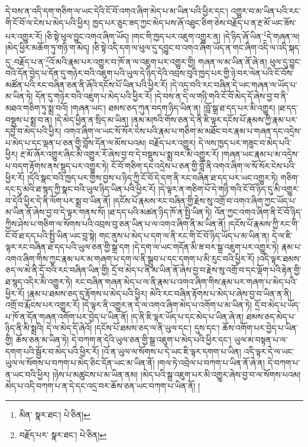 དེ་བས་ན་འདི་དག་གཅིག་ལ་ཡང་དེའི་ངོ་བོ་འགའ་ཞིག་མེད་པ་མ་ཡིན་པའི་ཕྱིར་དང་། འགྱུར་བ་མ་ཡིན་པའི་རང་གི་ངོ་བོ་ལ་ངེས་པ་མེད་པའི་ཕྱིར། ཁྱད་པར་ཅུང་ཟད་ཀྱང་མེད་པས་ཞོ་འཐུང་ཅིག་ཅེས་བརྗོད་པ་ན་རྔ་མོ་ཡང་ཟོས་པར་འགྱུར་རོ། །ཅི་སྟེ་ཕུལ་བྱུང་འགའ་ཞིག་ཡོད། །གང་གི་ཁྱད་པར་འཇུག་འགྱུར་ན། །དེ་ཉིད་ཞོ་ཡིན་\footnote{མིན་  སྣར་ཐང་།  པེ་ཅིན། }དེ་གཞན་ལ། །མེད་ཕྱིར་མཆོག་ཏུ་གཉི་ག་མེད། །ཅི་སྟེ་འདི་དག་ལ་ཕུལ་དུ་དབྱུང་བ་འགའ་ཞིག་ཡོད་ན་གང་ཞིག་འདི་ལ་འདི་སྐད་དུ་:བརྗོད་པ་ན་\footnote{བརྗོད་པར་  སྣར་ཐང་།  པེ་ཅིན། }འོ་མའི་རྣམ་པར་འགྱུར་བ་ཁོ་ན་ལ་འཇུག་པར་འགྱུར་གྱི། གཞན་ལ་མ་ཡིན་ནོ་ཞེ་ན། ཕུལ་དུ་བྱུང་བའི་དོན་བྱེད་པ་དོན་དུ་གཉེར་བའི་འཇུག་པའི་ཡུལ་དེ་ཉིད་དེའི་འབྲས་བུའི་ཁྱད་པར་གྱི་ཉེ་བར་ལེན་པའི་ངོ་བོས་མཚོན་པའི་རང་བཞིན་ཅན་ནི་ཞོའི་དངོས་པོ་ཡིན་པའི་ཕྱིར་རོ། །དེ་འདྲ་བའི་རང་བཞིན་དེ་ཡང་གཞན་ལ་ཡོད་པ་མ་ཡིན་ཏེ། དོན་དུ་གཉེར་བའི་འཇུག་པ་མེད་པའི་ཕྱིར་རོ། །དེ་བས་ན་དེ་ལ་གཉི་གའི་ངོ་བོ་མེད་དོ་ཞེས་བྱ་བ་ནི་མཐའ་གཅིག་ཏུ་སྨྲ་བའོ། །གཞན་ཡང་། ཐམས་ཅད་ཀུན་བདག་ཉིད་ཡིན་ན། །བློ་སྒྲ་ཐ་དད་པར་མི་འགྱུར། །ཐ་དད་བསྡུས་པ་སྨྲ་བ་ན། །དེ་མེད་ཕྱིན་ན་སྲིད་མ་ཡིན། །ནམ་མཁའི་གོས་ཅན་དེ་ནི་ཇི་ལྟར་དངོས་པོ་རྣམས་ཀྱི་རྣམ་པར་དབྱེ་བ་མེད་པའི་ཕྱིར། འགའ་ཞིག་ལ་ཡང་སོ་སོར་ངེས་པའི་རྣམ་པ་གཅིག་མ་མཐོང་བར་རྣམ་པ་གཞན་དང་འདྲེས་པ་མེད་པ་དང་ལྡན་པ་ཅན་གྱི་བློས་དོན་ལ་མོས་པའམ། བརྗོད་པར་འགྱུར། དེ་ལས་ཁྱད་པར་གཟུང་བ་མེད་པའི་ཕྱིར། རྔ་མོ་ཞོར་འགྱུར་ཞིང་མི་འགྱུར་རོ་ཞེས་བྱ་བ་དེ་བསྡུས་པ་སྨྲ་བར་མི་འགྱུར་རོ། །གཞན་ཡང་རྣམ་པ་མ་འདྲེས་པ་བདག་རྟོགས་ནས་སྡུད་པར་འགྱུར་ཏེ། ངོ་བོ་གཅིག་དང་འདྲེས་པ་ཅན་གྱི་བློ་ནི་འགའ་ཞིག་ལ་སོ་སོར་ངེས་པའི་ཕྱིར་རོ། །དེའི་སྣང་བའི་ཁྱད་པར་གྱིས་བྱས་པ་ཉིད་ཀྱི་ངོ་བོ་དེ་དག་ནི་རང་བཞིན་ཐ་དད་པར་ཡང་འགྱུར་ཏེ། གཅིག་དང་དུ་མའི་ཐ་སྙད་ཀྱི་སྣང་བའི་ཡུལ་ཉིད་ཡིན་པའི་ཕྱིར་རོ། །དེ་ལྟར་ན་གཅིག་པོ་དེ་གཉི་གའི་ངོ་བོ་ཉིད་དུ་མི་འགྱུར་བ་དེའི་ཕྱིར་དེ་ནི་ལོག་པར་སྨྲ་བ་ཡིན་ནོ། །དངོས་པོ་རྣམས་རང་བཞིན་གྱི་རྗེས་སུ་འགྲོ་བ་འགའ་ཞིག་ཀྱང་ཡོད་པ་མ་ཡིན་ནོ་ཞེས་བྱ་བ་དེ་ལྟར་གནས་སོ། །ཐ་དད་པའི་མཚན་ཉིད་ཁོ་ན་སྤྱི་ཡིན་ཏེ། འོན་ཀྱང་འགའ་ཞིག་ནི་ངོ་བོ་ཉིད་ཀྱིས་ཤེས་པ་གཅིག་ལ་སོགས་པའི་འབྲས་བུ་ཅན་ཡིན་པ་ལ་འགའ་ཞིག་ནི་མ་ཡིན་ནོ། །དངོས་པོ་རྣམས་ཀྱི་རང་གི་ངོ་བོ་ཐ་དད་པའི་སྤྱི་ཡིན་ཡང་བླ་སྟེ། གང་ནུས་པ་མེད་པ་དག་ལ་ནི་རང་གི་ངོ་བོ་ཉིད་ཡོད་པ་མ་ཡིན་ན། དེ་ལ་ཇི་ལྟར་རང་བཞིན་ཐ་དད་པའི་ཡུལ་ཅན་གྱི་སྒྲ་དག །དེ་དག་ལ་ཡང་གདོན་མི་ཟ་བར་སྒྲ་འཇུག་པར་འགྱུར་ཏེ། རྣམ་པ་འགའ་ཞིག་གིས་ཀྱང་རྣམ་པར་མ་གཞག་པ་དག་ལ་ནི་སྒྲུབ་པ་དང་དགག་པ་མི་རུང་བའི་ཕྱིར་རོ། །འདི་ལྟར་ཐམས་ཅད་ལ་མེ་ནི་དྲོ་བའི་རང་བཞིན་ཡིན་གྱི། དྲོ་བ་མེད་པ་ནི་མ་ཡིན་ནོ་ཞེས་བྱ་བ་རྗེས་སུ་འགྲོ་བ་དང་ལྡོག་པའི་རྟེན་གྱི་ཐ་སྙད་འདིར་མི་འགྱུར་ཏེ། རང་བཞིན་གཞན་མེད་པ་ལ་ནི་རྣམ་པ་འགའ་ཞིག་གིས་རྣམ་པར་གཞག་པ་མེད་པའི་ཕྱིར་རོ། །རྣམ་པ་ཐམས་ཅད་དུ་རྟོགས་པ་མེད་པའི་ཕྱིར། མེའི་རང་བཞིན་རྟོགས་པ་མེད་པ་ཞེས་བྱ་བ་ཡིན་ན་ནི། འགྲོ་བ་རྨོངས་པར་འགྱུར་རོ། །དེ་ལྟར་ནི་འགྱུར་ན་དེ་ལ་འགའ་ཞིག་མེད་པ་འགོག་པ་མ་ཡིན་ཏེ། དྲོ་བ་མེད་པ་ཡོད་པ་ཁོ་ན་དོན་གཞན་འགོག་པར་བྱེད་པ་ཡིན་ནོ། །ད་ནི་ཇི་ལྟར་ཡོད་པ་དང་མེད་པ་ཡིན་ཞེ་ན། ཐམས་ཅད་མེད་པ་ཉིད་ནི་མི་སྨྲའི། དེ་ལ་མེད་དོ་ཞེའོ། །དངོས་པོ་ཐམས་ཅད་ལ་ནི་ཡུལ་དང་། དུས་དང་། ཆོས་འགོག་པར་བྱེད་པ་ཡིན་གྱི། ཆོས་ཅན་མ་ཡིན་ཏེ། དེ་བཀག་ན་དེའི་ཡུལ་ཅན་གྱི་སྒྲ་འཇུག་པ་མེད་པའི་ཕྱིར་དང་། ཡུལ་མ་བསྟན་པ་ལ་དགག་པའི་སྦྱོར་བ་མེད་པའི་ཕྱིར་རོ། །འོ་ན་ཡུལ་ལ་སོགས་པ་དེ་ཡང་ཇི་ལྟར་དགག་པ་ཡིན། འདི་ལྟར་དེ་ལ་ཡང་ཡུལ་ལ་སོགས་པ་བཀག་པ་མེད་ཅིང་དོན་ཡང་མ་ཡིན་ནོ། །གལ་ཏེ་འབྲེལ་པ་བཀག་པ་ཡིན་ནོ་ཞེ་ན། དེ་བཀག་པ་ན་ཡང་བའི་ཕྱིར། །ཉེས་པ་མཚུངས་པ་མ་ཡིན་ནམ། །མེད་པའི་སྒྲ་འཇུག་པར་མི་འགྱུར་ཞེས་བྱ་བ་ལ་སོགས་པའམ། མེད་པ་འདི་བཀག་པ་ན་དེ་དང་འདྲ་བར་ཆོས་ཅན་ཡང་བཀག་པ་ཡིན་ནོ། །

